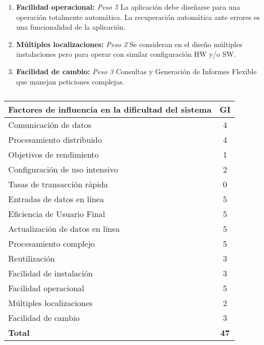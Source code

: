 \documentclass[11pt,a4paper,spanish,twoside]{book}
\begin{document}
\begin{enumerate}[{\bf 1.}]
\item {\bf Facilidad operacional:} \emph{Peso 5} La aplicación debe diseñarse
  para una operación totalmente automática. La recuperación automática ante
  errores es una funcionalidad de la aplicación. 

\item {\bf Múltiples localizaciones:} \emph{Peso 2} Se consideran en el diseño
  múltiples instalaciones pero para operar con similar configuración HW y/o
  SW.

\item {\bf Facilidad de cambio:} \emph{Peso 3} Consultas y Generación de
  Informes Flexible que manejan peticiones complejas.

\end{enumerate}
\begin{table}[!ht]
  \centering
  \begin{tabular}{|l|c|}
    \hline
    \textbf{Factores de influencia en la dificultad del sistema} & 
    \textbf{GI} \\
    \hline \hline
    Comunicación de datos           & 4 \\ \hline
    Procesamiento distribuido       & 4 \\ \hline
    Objetivos de rendimiento        & 1 \\ \hline
    Configuración de uso intensivo  & 2 \\ \hline
    Tasas de transacción rápida     & 0 \\ \hline
    Entradas de datos en línea      & 5 \\ \hline
    Eficiencia de Usuario Final     & 5 \\ \hline
    Actualización de datos en línea & 5 \\ \hline
    Procesamiento complejo          & 5 \\ \hline
    Reutilización                   & 3 \\ \hline
    Facilidad de instalación        & 3 \\ \hline
    Facilidad operacional           & 5 \\ \hline
    Múltiples localizaciones        & 2 \\ \hline
    Facilidad de cambio             & 3 \\ \hline \hline
    \textbf{Total}                  & \textbf{47} \\ \hline
  \end{tabular}
  \label{}
  \caption{}
\end{table}
\end{document}
